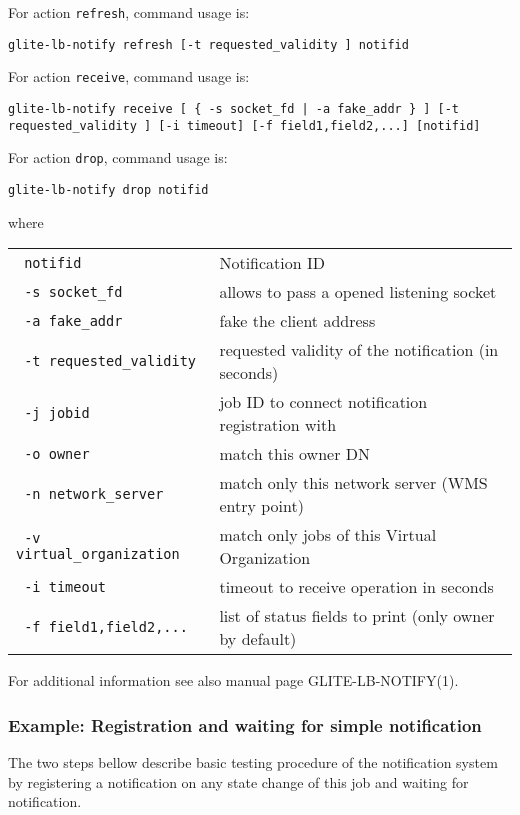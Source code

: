 For action \verb'refresh', command usage is:
\begin{verbatim}
glite-lb-notify refresh [-t requested_validity ] notifid
\end{verbatim}

For action \verb'receive', command usage is:
\begin{verbatim}
glite-lb-notify receive [ { -s socket_fd | -a fake_addr } ] [-t requested_validity ] [-i timeout] [-f field1,field2,...] [notifid]
\end{verbatim}

For action \verb'drop', command usage is:
\begin{verbatim}
glite-lb-notify drop notifid
\end{verbatim}

where

\begin{tabularx}{\textwidth}{lX}
\texttt{  notifid} & Notification ID \\
\texttt{  -s socket\_fd} &  allows  to  pass  a opened listening socket  \\
\texttt{  -a fake\_addr} &  fake the client address \\
\texttt{  -t requested\_validity} & requested validity of the notification (in seconds)   \\
\texttt{  -j jobid} & job ID to connect notification registration with   \\
\texttt{  -o owner} & match this owner DN   \\
\texttt{  -n network\_server} &  match only this network server (WMS entry point)  \\
\texttt{  -v virtual\_organization} & match only jobs of this Virtual Organization  \\
\texttt{  -i timeout} & timeout to receive operation in seconds   \\
\texttt{  -f field1,field2,...} & list of status fields to print (only owner by default)   \\
\end{tabularx}

For additional information see also manual page GLITE-LB-NOTIFY(1).

\subsubsection{Example: Registration and waiting for simple notification}
\label{e:notify}

The two steps bellow describe basic testing procedure of the notification
system by registering a notification on any state change of this job
and waiting for notification.

